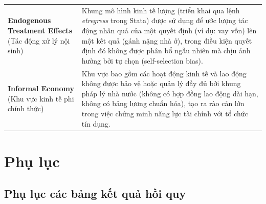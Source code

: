 \documentclass[12pt,a4paper]{report}
\begin{document}
\begin{table}[H]
\begin{tabularx}{\textwidth}{>{\raggedright\arraybackslash}p{4cm} X}
		\textbf{Endogenous Treatment Effects} 
		(Tác động xử lý nội sinh) 
		& Khung mô hình kinh tế lượng (triển khai qua lệnh \textit{etregress} trong Stata) được sử dụng để ước lượng tác động nhân quả của một quyết định (ví dụ: vay vốn) lên một kết quả (gánh nặng nhà ở), trong điều kiện quyết định đó không được phân bổ ngẫu nhiên mà chịu ảnh hưởng bởi tự chọn (self-selection bias). \\
		
		\textbf{Informal Economy} 
		(Khu vực kinh tế phi chính thức) 
		& Khu vực bao gồm các hoạt động kinh tế và lao động không được bảo vệ hoặc quản lý đầy đủ bởi khung pháp lý nhà nước (không có hợp đồng lao động dài hạn, không có bảng lương chuẩn hóa), tạo ra rào cản lớn trong việc chứng minh năng lực tài chính với tổ chức tín dụng. \\
		
		\bottomrule
	\end{tabularx}
\end{table}
\newpage
\appendix
\section*{Phụ lục}

\subsection{Phụ lục các bảng kết quả hồi quy}
\end{document}
